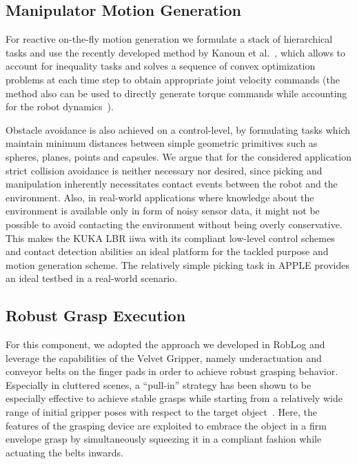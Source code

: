 \subsection{Manipulator Motion Generation}
\label{subsec:manip_motion}
%
For reactive on-the-fly motion generation we formulate a stack of hierarchical tasks and use the
recently developed method by Kanoun et al.~\cite{Kano11}, which allows to account for inequality
tasks and solves a sequence of convex optimization problems at each time step to obtain
appropriate joint velocity commands (the method also can be used to directly generate torque
commands while accounting for the robot dynamics~\cite{Saab13}).
 
Obstacle avoidance is also achieved on a control-level, by formulating tasks which maintain minimum
distances between simple geometric primitives such as spheres, planes, points and capsules. We argue
that for the considered application strict collision avoidance is neither necessary nor desired,
since picking and manipulation inherently necessitates contact events between the robot and the
environment. Also, in real-world applications where knowledge about the environment is available
only in form of noisy sensor data, it might not be possible to avoid contacting the environment
without being overly conservative. This makes the KUKA LBR iiwa with its compliant low-level control
schemes and contact detection abilities an ideal platform for the tackled purpose and motion
generation scheme. The relatively simple picking task in APPLE provides an ideal testbed in a
real-world scenario.
%
\subsection{Robust Grasp Execution}
\label{subsec:grasp_execution}
%
For this component, we adopted the approach we developed in RobLog and leverage the capabilities of
the Velvet Gripper, namely underactuation and conveyor belts on the finger pads in order to achieve
robust grasping behavior. Especially in cluttered scenes, a ``pull-in'' strategy has been shown to
be especially effective to achieve stable grasps while starting from a relatively wide range of
initial gripper poses with respect to the target object~\cite{Krug14a}. Here, the features of the
grasping device are exploited to embrace the object in a firm envelope grasp by simultaneously
squeezing it in a compliant fashion while actuating the belts inwards.
%

